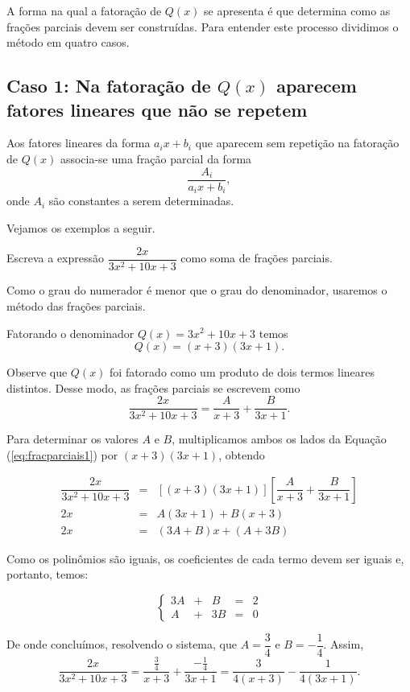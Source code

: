 A forma na qual a fatoração de $Q(x)$ se apresenta é que determina como as frações parciais devem ser construídas. Para entender este processo dividimos o método em quatro casos.

\subsection{Caso 1: Na fatoração de $Q(x)$ aparecem fatores lineares que não se repetem}

Aos fatores lineares da forma $a_i x + b_i$ que aparecem sem repetição na fatoração de $Q(x)$ associa-se uma fração parcial da forma $$\dfrac{A_i}{a_i x+b_i},$$
onde $A_i$ são constantes a serem determinadas.

Vejamos os exemplos a seguir.

\begin{exem}
    Escreva a expressão $\dfrac{2x}{3x^2 + 10x +3}$ como soma de frações parciais.

    Como o grau do numerador é menor que o grau do denominador, usaremos o método das frações parciais.

    Fatorando o denominador $Q(x) = 3x^2 + 10x +3$ temos $$Q(x) = (x+3)(3x+1).$$

    Observe que $Q(x)$ foi fatorado como um produto de dois termos lineares distintos. Desse modo, as frações parciais se escrevem como 
    \begin{equation}
    \label{eq:fracparciais1}
    \dfrac{2x}{3x^2 + 10x +3} = \dfrac{A}{x+3} + \dfrac{B}{3x+1}.
    \end{equation}

    Para determinar os valores $A$ e $B$, multiplicamos ambos os lados da Equação (\ref{eq:fracparciais1}) por $(x+3)(3x+1)$, obtendo

    \begin{eqnarray*}
    [(x+3)(3x+1)]\dfrac{2x}{3x^2 + 10x +3} & = & [(x+3)(3x+1)] \left[\dfrac{A}{x+3} + \dfrac{B}{3x+1}\right]\\[5pt]
    2x & =& A(3x+1) + B(x+3)\\[5pt]
    2x & =& (3A + B)x + (A + 3B)
    \end{eqnarray*}

    Como os polinômios são iguais, os coeficientes de cada termo devem ser iguais e, portanto, temos:

    \begin{equation*}
    \left\{ \begin{array}{ccccc} 3A & + & B &=& 2 \\[5pt]
    A & + & 3B & =& 0
    \end{array}
    \right.    
    \end{equation*}

    De onde concluímos, resolvendo o sistema, que $A = \dfrac{3}{4}$ e $B = -\dfrac{1}{4}$. Assim, $$\dfrac{2x}{3x^2 + 10x +3} = \dfrac{\frac{3}{4}}{x+3} + \dfrac{-\frac{1}{4}}{3x+1}  = \dfrac{3}{4(x+3)} -\dfrac{1}{4(3x+1)}.$$
\end{exem}

